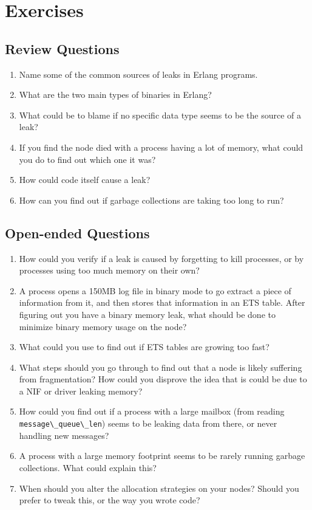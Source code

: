\documentclass[11pt, oneside]{book}   	%
\newcommand{\term}[1]{\Verb`#1`}
\begin{document}
\section{Exercises}

\subsection{Review Questions}

\begin{enumerate}
	\item Name some of the common sources of leaks in Erlang programs.
	\item What are the two main types of binaries in Erlang?
	\item What could be to blame if no specific data type seems to be the source of a leak?
	\item If you find the node died with a process having a lot of memory, what could you do to find out which one it was?
	\item How could code itself cause a leak?
	\item How can you find out if garbage collections are taking too long to run?
\end{enumerate}

\subsection{Open-ended Questions}

\begin{enumerate}
	\item  How could you verify if a leak is caused by forgetting to kill processes, or by processes using too much memory on their own?
	\item A process opens a 150MB log file in binary mode to go extract a piece of information from it, and then stores that information in an ETS table. After figuring out you have a binary memory leak, what should be done to minimize binary memory usage on the node?
	\item What could you use to find out if ETS tables are growing too fast?
	\item What steps should you go through to find out that a node is likely suffering from fragmentation? How could you disprove the idea that is could be due to a NIF or driver leaking memory?
	\item How could you find out if a process with a large mailbox (from reading \term{message\_queue\_len}) seems to be leaking data from there, or never handling new messages?
	\item A process with a large memory footprint seems to be rarely running garbage collections. What could explain this?
	\item When should you alter the allocation strategies on your nodes? Should you prefer to tweak this, or the way you wrote code?
\end{enumerate}
\end{document}
